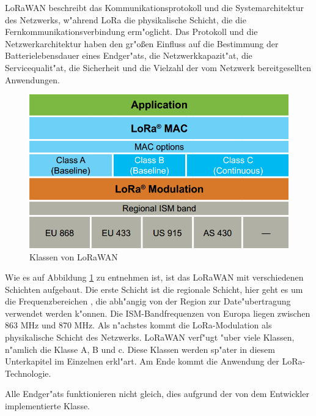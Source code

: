 LoRaWAN beschreibt das Kommunikationsprotokoll und die 
Systemarchitektur des Netzwerks, w"ahrend LoRa die physikalische 
Schicht, die die Fernkommunikationsverbindung erm"oglicht. Das 
Protokoll und die Netzwerkarchitektur haben den gr"o\ss{}en Einfluss 
auf die Bestimmung der Batterielebensdauer eines Endger"ats, die 
Netzwerkkapazit"at, die Servicequalit"at, die Sicherheit und die 
Vielzahl der vom Netzwerk bereitgesellten Anwendungen. 

\begin{figure}[h]
	\centering
	\includegraphics[width=13.5cm]{source/images/LoRa_MAC}
	\caption{Klassen von LoRaWAN \cite{LoRaWAN}\label{fig:LoRaMAC}}
\end{figure}

Wie es auf Abbildung \ref{fig:LoRaMAC} zu entnehmen ist, ist das 
LoRaWAN mit verschiedenen Schichten aufgebaut. Die erste Schicht ist 
die regionale Schicht, hier geht es um die Frequenzbereichen , die 
abh"angig von der Region zur Date"ubertragung verwendet werden k"onnen. 
Die ISM-Bandfrequenzen von Europa liegen zwischen 863 MHz und 870 MHz.
Als n"achstes kommt die LoRa-Modulation als physikalische Schicht des 
Netzwerks. LoRaWAN verf"ugt "uber viele Klassen, n"amlich die Klasse A, 
B und c. Diese Klassen werden sp"ater in diesem Unterkapitel im 
Einzelnen erkl"art. Am Ende kommt die Anwendung der LoRa-Technologie.

Alle Endger"ats funktionieren nicht gleich, dies aufgrund der von dem 
Entwickler implementierte Klasse.

